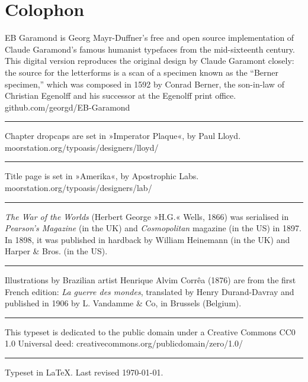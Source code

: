 \documentclass[
paper=5.5in:8.5in,
BCOR=7mm,
twoside,
DIV=calc,
11pt,
usegeometry,
chapterprefix,
headings=big]{scrbook} %
\begin{document}
\chapter*{Colophon}
\begin{center}
EB Garamond is Georg Mayr-Duffner's free and open source implementation of Claude Garamond’s famous humanist typefaces from the mid-sixteenth century. This digital version reproduces the original design by Claude Garamont closely: the source for the letterforms is a scan of a specimen known as the \enquote{Berner specimen,} which was composed in 1592 by Conrad Berner, the son-in-law of Christian Egenolff and his successor at the Egenolff print office.  \\github.com/georgd/EB-Garamond
\vfill
\rule{0.5\textwidth}{.4pt}
\vfill
Chapter dropcaps are set in »Imperator Plaque«, by Paul Lloyd.\\moorstation.org/typoasis/designers/lloyd/
\vfill
\rule{0.5\textwidth}{.4pt}
\vfill
Title page is set in »Amerika«, by Apostrophic Labs.\\moorstation.org/typoasis/designers/lab/
\vfill
\rule{0.5\textwidth}{.4pt}
\vfill
\textit{The War of the Worlds} (Herbert George »H.G.« Wells, 1866) was serialised in \textit{Pearson's Magazine} (in the UK) and \textit{Cosmopolitan} magazine (in the US) in 1897. In 1898, it was published in hardback by William Heinemann (in the UK) and Harper \& Bros. (in the US). 
\vfill
\rule{0.5\textwidth}{.4pt}
\vfill
Illustrations by Brazilian artist Henrique Alvim Corrêa (1876) are from the first French edition: \textit{La guerre des mondes}, translated by Henry Durand-Davray and published in 1906 by L. Vandamme \& Co, in Brussels (Belgium).
\vfill
\rule{0.5\textwidth}{.4pt}
\vfill
This typeset is dedicated to the public domain under a Creative Commons CC0 1.0 Universal deed: creativecommons.org/publicdomain/zero/1.0/
\vfill
\rule{0.5\textwidth}{.4pt}
\vfill
Typeset in \LaTeX{}. Last revised \today.
\end{center}
\thispagestyle{empty}
\end{document}
